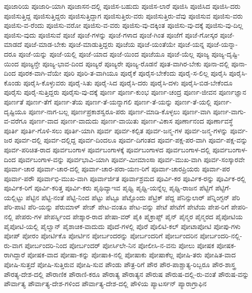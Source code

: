 {ಪೂಜಾರಿಯ
ಪೂಜಾರಿ-ಯಾಗಿ
ಪೂಜಾಸನ-ದಲ್ಲಿ
ಪೂಜಿಸ-ಬಹುದು
ಪೂಜಿಸ-ಲಾರೆ
ಪೂಜಿಸಿ
ಪೂಜಿಸಿದ
ಪೂಜಿಸಿ-ದರು
ಪೂಜಿಸುತ್ತಿದ್ದ
ಪೂಜಿಸುತ್ತಿದ್ದರು
ಪೂಜಿಸುತ್ತಿದ್ದಾಗ
ಪೂಜಿಸುತ್ತಿರು-ವರು
ಪೂಜಿಸುತ್ತಿರು-ವೆವು
ಪೂಜಿಸುವ
ಪೂಜಿಸು-ವರು
ಪೂಜಿಸು-ವ-ರೆಂದು
ಪೂಜಿಸು-ವರೋ
ಪೂಜಿಸು-ವ-ವರು
ಪೂಜಿಸು-ವು-ದಕ್ಕಿಂತ
ಪೂಜಿಸು-ವು-ದಕ್ಕೆ
ಪೂಜಿಸು-ವು-ದಿಲ್ಲ
ಪೂಜಿಸು-ವುದು
ಪೂಜಿಸುವೆ
ಪೂಜೆ
ಪೂಜೆ-ಗಳನ್ನು
ಪೂಜೆ-ಗಳಾದ
ಪೂಜೆ-ಗಿಂತ
ಪೂಜೆಗೆ
ಪೂಜೆ-ಗೋಸ್ಕರ
ಪೂಜೆ-ಮಾಡದೆ
ಪೂಜೆ-ಮಾಡ-ಬೇಕು
ಪೂಜೆ-ಮಾಡುತ್ತಿದ್ದರು
ಪೂಜೆಯ
ಪೂಜೆ-ಯಂತೆಯೇ
ಪೂಜೆ-ಯನ್ನ
ಪೂಜೆ-ಯನ್ನಾ-ದರೂ
ಪೂಜೆ-ಯನ್ನು
ಪೂಜೆ-ಯಲ್ಲಿ
ಪೂಜೆ-ಯಾದ
ಪೂಜೆ-ಯಿಂದ
ಪೂಜೆಯೂ
ಪೂಜೆ-ಯೆಲ್ಲ
ಪೂಜ್ಯ
ಪೂಜ್ಯ-ದೃಷ್ಟಿ-ಯಿಂದ
ಪೂಜ್ಯನ್ತೇ
ಪೂಜ್ಯ-ಭಾವ-ದಿಂದ
ಪೂಜ್ಯರೆ
ಪೂಜ್ಯರೇ
ಪೂಜ್ಯ-ರೊಡನೆ
ಪೂತ-ವಾಗಿರ-ಬೇಕು
ಪೂನಾ-ದಲ್ಲಿ
ಪೂನಾ-ದಿಂದ
ಪೂರಕ-ವಾಗಿ-ವೆಯೇ
ಪೂರಿ
ಪೂರಿ-ತ-ವಾಗಿಯೂ
ಪೂರೈಕೆ
ಪೂರೈಸ-ಬೇಕೆಂದು
ಪೂರೈ-ಸ-ಲಿಲ್ಲ
ಪೂರೈಸಿ
ಪೂರೈಸಿ-ಕೊಂಡು
ಪೂರೈಸಿ-ಕೊಳ್ಳುವರು
ಪೂರೈ-ಸಿತು
ಪೂರೈ-ಸಿದ
ಪೂರೈಸಿ-ದರು
ಪೂರೈಸಿ-ದಳು
ಪೂರೈಸಿ-ಬಿಡ-ಬೇಕೆಂದೂ
ಪೂರೈಸು
ಪೂರೈ-ಸುತ್ತಿದ್ದರು
ಪೂರೈಸು-ವು-ದಕ್ಕೆ
ಪೂರ್ಣ
ಪೂರ್ಣ-ಕುಂಭ
ಪೂರ್ಣ-ಚಂದ್ರ
ಪೂರ್ಣ-ಜೀವನ
ಪೂರ್ಣಜ್ಞಾನ
ಪೂರ್ಣತೆ
ಪೂರ್ಣ-ತೆಗೆ
ಪೂರ್ಣ-ತೆಯ
ಪೂರ್ಣ-ತೆ-ಯನ್ನಾಗಲಿ
ಪೂರ್ಣ-ತೆ-ಯನ್ನು
ಪೂರ್ಣ-ತೆ-ಯಲ್ಲಿ
ಪೂರ್ಣ-ದೃಷ್ಟಿಯೂ
ಪೂರ್ಣ-ನಾಗ-ಬಲ್ಲ
ಪೂರ್ಣಪ್ರಕಾಶಸ್ವರೂ-ಪರು
ಪೂರ್ಣ-ಮಾಡಿ-ಕೊಳ್ಳಲು
ಪೂರ್ಣ-ವಾಗಿ
ಪೂರ್ಣ-ವಾಗು-ವ-ವರೆಗೂ
ಪೂರ್ಣ-ವಾದ
ಪೂರ್ಣ-ವಾದುದು
ಪೂರ್ಣ-ವಾಯಿತು
ಪೂರ್ಣ-ವಿಕಾಸ
ಪೂರ್ಣಾನಂದ
ಪೂರ್ಣಾವಸ್ಥೆ
ಪೂರ್ತಿ
ಪೂರ್ತಿ-ಗೊಳಿ-ಸಲು
ಪೂರ್ತಿ-ಯಾಗಿ
ಪೂರ್ವ
ಪೂರ್ವ-ಕಲ್ಪಿತ
ಪೂರ್ವ-ಜನ್ಮ-ಗಳ
ಪೂರ್ವ-ಜನ್ಮ-ಗಳನ್ನು
ಪೂರ್ವ-ಜರ
ಪೂರ್ವ-ದಲ್ಲಿ
ಪೂರ್ವ-ದಲ್ಲಿದ್ದ
ಪೂರ್ವ-ದಿಂದಲೂ
ಪೂರ್ವ-ದಿಗಂತದ
ಪೂರ್ವ-ಪಕ್ಷ-ಪರ-ವಾಗಿ
ಪೂರ್ವ-ಪಕ್ಷ-ವನ್ನು
ಪೂರ್ವ-ಪರಿಚಿತ-ರಾದ
ಪೂರ್ವಬಂಗಾಳ
ಪೂರ್ವಬಂಗಾಳಕ್ಕೆ
ಪೂರ್ವಬಂಗಾಳದ
ಪೂರ್ವಬಂಗಾಳ-ದಲ್ಲಿ
ಪೂರ್ವಬಂಗಾಳ-ದಿಂದ
ಪೂರ್ವಬಂಗಾಳ-ವನ್ನು
ಪೂರ್ವಭಾವಿ-ಯಾಗಿ
ಪೂರ್ವ-ಮೀಮಾಂಸಾ
ಪೂರ್ವ-ಮುಖ-ವಾಗಿ
ಪೂರ್ವ-ಸಂಸ್ಕಾರವೇ
ಪೂರ್ವಾ-ಚಾರ
ಪೂರ್ವಾ-ಚಾರ-ದಲ್ಲಿ
ಪೂರ್ವಾ-ಚಾರ-ಪರಾ-ಯಣ-ರಿಗೆ
ಪೂರ್ವಾ-ಚಾರಪ್ರಿಯರು
ಪೂರ್ವಾ-ಪರ
ಪೂರ್ವಾ-ಪರೌ
ಪೂರ್ವಾಭಿ-ಮುಖ-ವಾಗಿ
ಪೂರ್ವಾರ್ಜಿತ
ಪೂರ್ವಾಶ್ರಮದ
ಪೂರ್ವಿ-ಕರ
ಪೂರ್ವಿಕ-ರನ್ನು
ಪೂರ್ವಿಕ-ರಲ್ಲಿ
ಪೂರ್ವಿಕ-ರಿಗೆ
ಪೂರ್ವಿ-ಕರಿತ್ತ
ಪೂರ್ವಿ-ಕರು
ಪೃಥಿವ್ಯಾಇವ
ಪೃಥ್ವಿ
ಪೃಥ್ವಿ-ಯನ್ನೆಲ್ಲ
ಪೃಥ್ವಿ-ರಾಜನ
ಪೆಟ್ಟಿಗೆ
ಪೆಟ್ಟಿಗೆ-ಯಲ್ಲಿಟ್ಟು
ಪೆಟ್ಟಿನ
ಪೆಟ್ಟಿ-ನಂತೆ
ಪೆಟ್ಟಿ-ನಿಂದ
ಪೆಟ್ಟು
ಪೆಟ್ಟೂ
ಪೆಟ್ಟೊಂದು
ಪೆಟ್ರಿಕ್
ಪೆದ್ದ
ಪೆನಿನ್ಸುಲಾರ್
ಪೆನ್ನಿಂಗ್ಟನ್
ಪೆರಿ
ಪೆರಿ-ಪಾಟಿ
ಪೆರಿ-ಯನ್ನು
ಪೆರುಮಾಳ್
ಪೇಜ್
ಪೇಟ-ವಂತೂ
ಪೇಟ-ವನ್ನು
ಪೇಟೆ
ಪೇಟೆಗೆ
ಪೇಟೆಯ
ಪೇಪ-ರಿಗೆ
ಪೇಪರಿ-ನಲ್ಲಿ
ಪೇಪರು-ಗಳ
ಪೇಪರ್ಸ್ನಿಂದ
ಪೇಶ್ಕಾರ-ರಾದ
ಪೇಷಾ-ವರ್
ಪೈಕಿ
ಪೈಕ್ರಾಪ್ಟ್
ಪೈನ್
ಪೈನ್ಮರ
ಪೈನ್ಮರದ
ಪೈಪೋಟಿಯ
ಪೈಪೋಟಿ-ಯಲ್ಲಿ
ಪೈಲ್ವಾನ್
ಪೈಶಾಚಿಕ-ವಾದುದು
ಪೊದೆ-ಗಳಲ್ಲಿ
ಪೊರೆ
ಪೊಲಿಟಿ-ಕಲ್
ಪೋಟಾಪೋಟಿ
ಪೋಪು-ಗಳು
ಪೋಪ್
ಪೋರಂ
ಪೋರ್ಟಿಕೊ
ಪೋರ್ಟಿನ
ಪೋರ್ಬಂದರನ್ನು
ಪೋರ್ಬಂದರಿಗೆ
ಪೋರ್ಬಂದರಿನ
ಪೋರ್ಬಂದರಿ-ನಲ್ಲಿ-ರು-ವಾಗ
ಪೋರ್ಬಂದರಿ-ನಿಂದ
ಪೋರ್ಬಂದರ್
ಪೋರ್ಸಿಲೇ-ನಿನ
ಪೋಲೀಸಿ-ನ-ವನು
ಪೋಲು
ಪೋಷಕ
ಪೋಷಕ-ರಾಗಿದ್ದಾರೆ
ಪೋಷಕ-ವಾದ
ಪೋಷಾ-ಕನ್ನು
ಪೋಷಾಕಿ-ನಲ್ಲಿ
ಪೋಷಾಕು
ಪೋಷಾಕೆಲ್ಲ
ಪೋಷಿ-ತರು
ಪೋಷಿತ-ವಾದ
ಪೋಷಿ-ಸುತ್ತದೆ
ಪೋಷಿ-ಸುತ್ತಿರುವ
ಪೋಷಿ-ಸುವ
ಪೌಂಡು
ಪೌತ್ರ-ರಿಗೆ
ಪೌರ
ಪೌರ-ಪಾಶ್ಚಾತ್ಯ-ರಿಬ್ಬರೂ
ಪೌರ-ಶಾಸ್ತ್ರ
ಪೌರತ್ಯ-ದೇಶ-ದಲ್ಲಿ
ಪೌರಾಣಿಕ
ಪೌರಾಣಿ-ಕರೂ
ಪೌರಾತ್ಯ
ಪೌರಾತ್ಯನ
ಪೌರುಷ
ಪೌರುಷ-ದಲ್ಲಿ-ರು-ವಂತೆ
ಪೌರುಷ-ವನ್ನು
ಪೌರ್ವಾತ್ಯ
ಪೌರ್ವಾತ್ಯ-ದೇಶ-ಗಳಿಂದ
ಪೌರ್ವಾತ್ಯ-ದೇಶ-ದಲ್ಲಿ
ಪೌಳಿಯ
ಪ್ಯಾಟರ್ಸನ್
ಪ್ಯಾರಾಗ್ರಾಫಿನ
}
